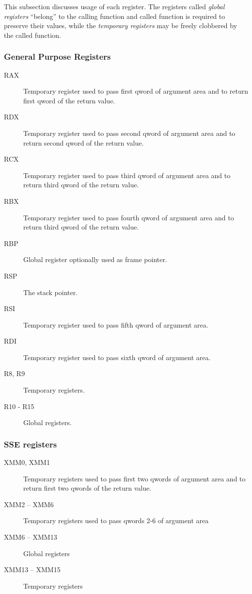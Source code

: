 This subsection discusses usage of each register.  The registers called
\emph{global registers} ``belong'' to the calling function and called function
is required to preserve their values, while the \emph{temporary registers} may
be freely clobbered by the called function.

\subsubsection {General Purpose Registers}
\begin{description}
\item [RAX]
Temporary register used to pass first qword of argument area and to return
first qword of the return value.
\item [RDX]
Temporary register used to pass second qword of argument area
and to return second qword of the return value.
\item [RCX] Temporary register used to pass third qword of argument area
and to return third qword of the return value.
\item [RBX] Temporary register used to pass fourth qword of argument area
and to return third qword of the return value.
\item [RBP] Global register optionally used as frame pointer.
\item [RSP] The stack pointer.
\item [RSI]
Temporary register used to pass fifth qword of argument area.
\item [RDI] 
Temporary register used to pass sixth qword of argument area.
\item [R8, R9] Temporary registers.
\item [R10 - R15] Global registers.
\end{description}


\subsubsection {SSE registers}
\begin{description}
\item [XMM0, XMM1] Temporary registers used to pass first two qwords of argument area and
to return first two qwords of the return value.
\item [XMM2 -- XMM6] Temporary registers used to pass qwords 2-6 of argument area
\item [XMM6 -- XMM13] Global registers
\item [XMM13 -- XMM15] Temporary registers
\end{description}


